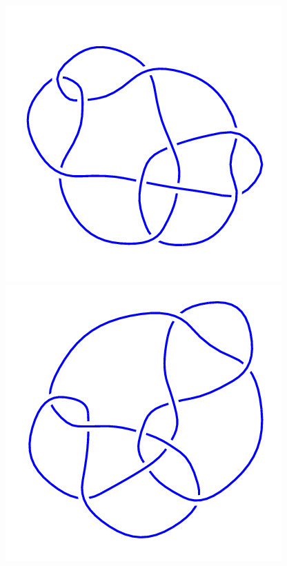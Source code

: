 \begin{figure}[H]
	\begin{minipage}[b]{.18\linewidth}
		\centering
		\includegraphics[width=\linewidth]{../data/10_87.png}
	\end{minipage}
	\begin{minipage}[b]{.18\linewidth}
		\centering
		\includegraphics[width=\linewidth]{../data/10_88.png}

\end{minipage}
\end{figure}
